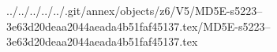 ../../../../../.git/annex/objects/z6/V5/MD5E-s5223--3e63d20deaa2044aeada4b51faf45137.tex/MD5E-s5223--3e63d20deaa2044aeada4b51faf45137.tex